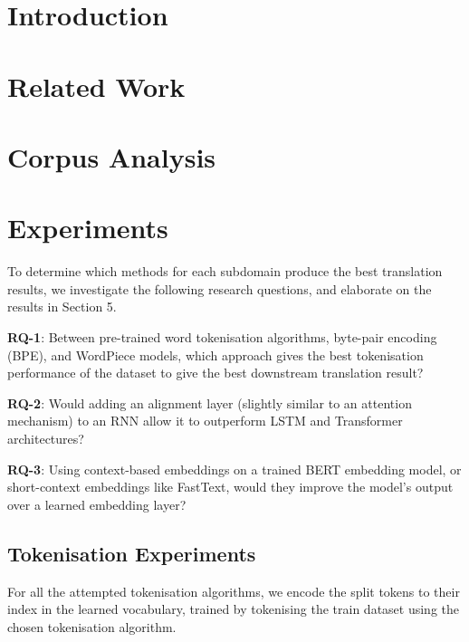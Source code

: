 \documentclass[11pt]{article}
\begin{document}
\section{Introduction}
\section{Related Work}
\section{Corpus Analysis}
\section{Experiments}

To determine which methods for each subdomain produce the best translation
results, we investigate the following research questions, and elaborate on the results in Section 5.

\vspace{5pt} \noindent \textbf{RQ-1}: Between pre-trained word tokenisation
algorithms, byte-pair encoding (BPE), and WordPiece models, which
approach gives the best tokenisation performance of the dataset to give the
best downstream translation result?

\vspace{5pt} \noindent \textbf{RQ-2}: Would adding an alignment layer (slightly
similar to an attention mechanism) to an RNN allow it to outperform LSTM and Transformer
architectures?

\vspace{5pt} \noindent \textbf{RQ-3}: Using context-based embeddings on a
trained BERT embedding model, or short-context embeddings like FastText, would
they improve the model’s output over a learned embedding layer? 

\subsection{Tokenisation Experiments}

For all the attempted tokenisation algorithms, we encode the split tokens to their index in the learned vocabulary, trained by tokenising the train dataset using the chosen tokenisation algorithm.
\end{document}
